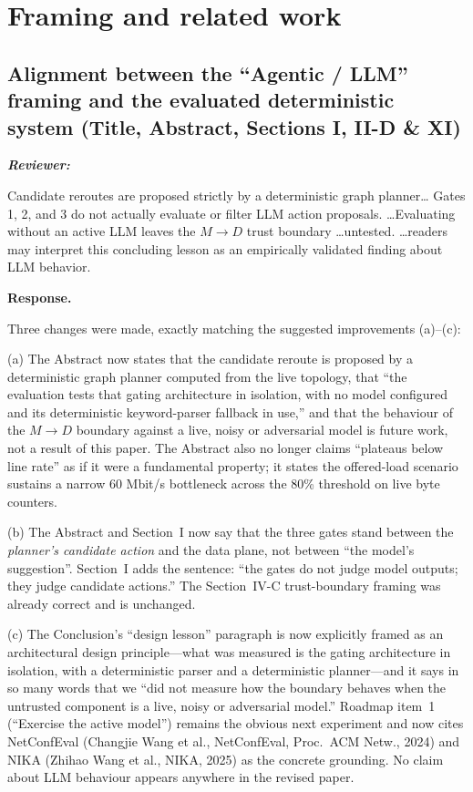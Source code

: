 \documentclass[11pt,a4paper]{article}
\newenvironment{reviewer}{\par\medskip\noindent\begin{minipage}{\linewidth}\small\itshape\color{quote}\textbf{Reviewer:}\par}{\end{minipage}\medskip\par}
\newenvironment{response}{\par\noindent\begin{minipage}{\linewidth}\small\textbf{Response.}\par}{\end{minipage}\medskip\par}
\begin{document}
\section{Framing and related work}

\subsection{Alignment between the ``Agentic / LLM'' framing and the evaluated
deterministic system (Title, Abstract, Sections I, II-D \& XI)}

\begin{reviewer}
Candidate reroutes are proposed strictly by a deterministic graph planner\dots
Gates 1, 2, and 3 do not actually evaluate or filter LLM action proposals.
\dots Evaluating without an active LLM leaves the $M \to D$ trust boundary
\dots untested. \dots readers may interpret this concluding lesson as an
empirically validated finding about LLM behavior.
\end{reviewer}

\begin{response}
Three changes were made, exactly matching the suggested improvements
(a)--(c):

(a) The Abstract now states that the candidate reroute is proposed by a
deterministic graph planner computed from the live topology, that ``the
evaluation tests that gating architecture in isolation, with no model
configured and its deterministic keyword-parser fallback in use,'' and that
the behaviour of the $M \rightarrow D$ boundary against a live, noisy or
adversarial model is future work, not a result of this paper. The Abstract
also no longer claims ``plateaus below line rate'' as if it were a
fundamental property; it states the offered-load scenario sustains a
narrow 60 Mbit/s bottleneck across the 80\% threshold on live byte
counters.

(b) The Abstract and Section~I now say that the three gates stand between
the \emph{planner's candidate action} and the data plane, not between
``the model's suggestion''. Section~I adds the sentence: ``the gates do
not judge model outputs; they judge candidate actions.'' The Section~IV-C
trust-boundary framing was already correct and is unchanged.

(c) The Conclusion's ``design lesson'' paragraph is now explicitly framed
as an architectural design principle---what was measured is the gating
architecture in isolation, with a deterministic parser and a deterministic
planner---and it says in so many words that we ``did not measure how the
boundary behaves when the untrusted component is a live, noisy or
adversarial model.'' Roadmap item~1 (``Exercise the active model'')
remains the obvious next experiment and now cites NetConfEval
(Changjie Wang et al., NetConfEval, Proc.~ACM Netw., 2024) and NIKA (Zhihao Wang et al., NIKA, 2025) as the concrete
grounding. No claim about LLM behaviour appears anywhere in the revised
paper.
\end{response}
\end{document}
